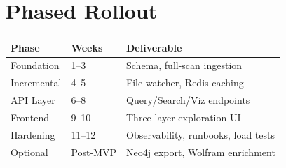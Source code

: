 \section{Phased Rollout}
\begin{table}[h]
\centering
\begin{tabular}{@{}lll@{}}
\toprule
\textbf{Phase} & \textbf{Weeks} & \textbf{Deliverable} \\
\midrule
Foundation       & 1--3   & Schema, full-scan ingestion \\
Incremental      & 4--5   & File watcher, Redis caching \\
API Layer        & 6--8   & Query/Search/Viz endpoints \\
Frontend         & 9--10  & Three-layer exploration UI \\
Hardening        & 11--12 & Observability, runbooks, load tests \\
Optional         & Post-MVP & Neo4j export, Wolfram enrichment \\
\bottomrule
\end{tabular}
\end{table}
